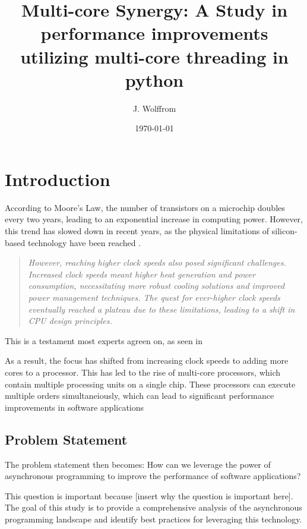 \documentclass{article}
\title{Multi-core Synergy: A Study in performance improvements utilizing multi-core threading in python}
\author{J. Wolffrom}
\date{\today}
\begin{document}
 

\maketitle
\newpage

\begin{abstract}

\end{abstract}
\newpage

\tableofcontents

\newpage
\section{Introduction}

According to Moore's Law, the number of transistors on a microchip doubles every two years, leading to an exponential increase in computing power. 
However, this trend has slowed down in recent years, as the physical limitations of silicon-based technology have been reached \parencite{Mattson2014}.
\begin{quote}
    \textit{However, reaching higher clock speeds also posed significant challenges. Increased clock speeds meant higher heat generation and power consumption, necessitating more robust cooling solutions and improved power management techniques. The quest for ever-higher clock speeds eventually reached a plateau due to these limitations, leading to a shift in CPU design principles.} 
    \parencite{mscodes} 
\end{quote}

This is a testament most experts agreen on, as seen in 

As a result, the focus has shifted from increasing clock speeds to adding more cores to a processor. This has led to the rise of multi-core processors, which contain multiple processing units on a single chip. 
These processors can execute multiple orders simultaneiously, which can lead to significant performance improvements in software applications 

\subsection{Problem Statement}

The problem statement then becomes: How can we leverage the power of asynchronous programming to improve the performance of software applications? 
\newline

This question is important because [insert why the question is important here]. The goal of this study is to provide a comprehensive analysis of the asynchronous programming landscape and identify best practices for leveraging this technology.
\end{document}
